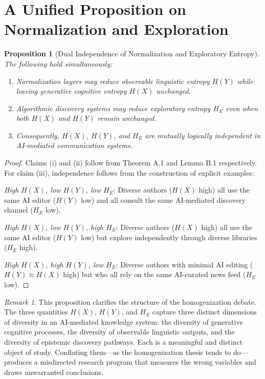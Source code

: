 \documentclass[12pt,a4paper]{article}
\theoremstyle{definition}
\theoremstyle{plain}
\newtheorem{proposition}[definition]{Proposition}
\theoremstyle{remark}
\newtheorem{remark}[definition]{Remark}
\newcommand{\HE}{H_{E}}
\begin{document}
\section{A Unified Proposition on Normalization and Exploration}
\label{app:unified}

\begin{proposition}[Dual Independence of Normalization and Exploratory Entropy]
The following hold simultaneously:

\begin{enumerate}[label=(\roman*)]
\item Normalization layers may reduce observable linguistic entropy $H(Y)$ while leaving
generative cognitive entropy $H(X)$ unchanged.

\item Algorithmic discovery systems may reduce exploratory entropy $\HE$ even when both
$H(X)$ and $H(Y)$ remain unchanged.

\item Consequently, $H(X)$, $H(Y)$, and $\HE$ are mutually logically independent in
AI-mediated communication systems.
\end{enumerate}
\end{proposition}

\begin{proof}
Claims (i) and (ii) follow from Theorem A.1 and Lemma B.1 respectively. For claim (iii),
independence follows from the construction of explicit examples:

\emph{High $H(X)$, low $H(Y)$, low $\HE$}: Diverse authors ($H(X)$ high) all use the same
AI editor ($H(Y)$ low) and all consult the same AI-mediated discovery channel ($\HE$ low).

\emph{High $H(X)$, low $H(Y)$, high $\HE$}: Diverse authors ($H(X)$ high) all use the same
AI editor ($H(Y)$ low) but explore independently through diverse libraries ($\HE$ high).

\emph{High $H(X)$, high $H(Y)$, low $\HE$}: Diverse authors with minimal AI editing
($H(Y) \approx H(X)$ high) but who all rely on the same AI-curated news feed ($\HE$ low).
\end{proof}

\begin{remark}
This proposition clarifies the structure of the homogenization debate. The three quantities
$H(X)$, $H(Y)$, and $\HE$ capture three distinct dimensions of diversity in an AI-mediated
knowledge system: the diversity of generative cognitive processes, the diversity of observable
linguistic outputs, and the diversity of epistemic discovery pathways. Each is a meaningful
and distinct object of study. Conflating them---as the homogenization thesis tends to
do---produces a misdirected research program that measures the wrong variables and draws
unwarranted conclusions.
\end{remark}
\end{document}
